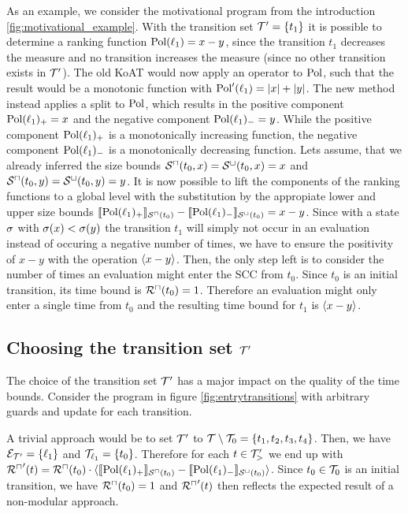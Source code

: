 



As an example, we consider the motivational program from the introduction \ref{fig:motivational_example}.
With the transition set $\mathcal{T}' = \lbrace t_1 \rbrace$ it is possible to determine a ranking function $\text{Pol}(\ell_1) = x - y$, since the transition $t_1$ decreases the measure and no transition increases the measure (since no other transition exists in $\mathcal{T}'$).
The old KoAT would now apply an operator to $\text{Pol}$, such that the result would be a monotonic function with $\text{Pol}'(\ell_1) = \left|x\right| + \left|y\right|$.
The new method instead applies a split to $\text{Pol}$, which results in the positive component $\text{Pol}(\ell_1)_+ = x$ and the negative component $\text{Pol}(\ell_1)_- = y$.
While the positive component $\text{Pol}(\ell_1)_+$ is a monotonically increasing function, the negative component $\text{Pol}(\ell_1)_-$ is a monotonically decreasing function.
Lets assume, that we already inferred the size bounds ${\mathcal{S}^\sqcap}(t_0,x) = {\mathcal{S}^\sqcup}(t_0,x) = x$ and ${\mathcal{S}^\sqcap}(t_0,y) = {\mathcal{S}^\sqcup}(t_0,y) = y$.
It is now possible to lift the components of the ranking functions to a global level with the substitution by the appropiate lower and upper size bounds $\llbracket \text{Pol}(\ell_1)_+ \rrbracket_{{\mathcal{S}^\sqcap}(t_0)} - \llbracket \text{Pol}(\ell_1)_- \rrbracket_{{\mathcal{S}^\sqcup}(t_0)} = x - y$.
Since with a state $\sigma$ with $\sigma(x) < \sigma(y)$ the transition $t_1$ will simply not occur in an evaluation instead of occuring a negative number of times, we have to ensure the positivity of $x - y$ with the operation $\langle x - y\rangle$.
Then, the only step left is to consider the number of times an evaluation might enter the SCC from $t_0$.
Since $t_0$ is an initial transition, its time bound is ${\mathcal{R}^\sqcap}(t_0) = 1$.
Therefore an evaluation might only enter a single time from $t_0$ and the resulting time bound for $t_1$ is $\langle x - y\rangle$.

\subsection{Choosing the transition set $\mathcal{T}'$}



The choice of the transition set $\mathcal{T}'$ has a major impact on the quality of the time bounds.
Consider the program in figure \ref{fig:entrytransitions} with arbitrary guards and update for each transition.

A trivial approach would be to set $\mathcal{T}'$ to $\mathcal{T} \setminus \mathcal{T}_0 = \lbrace t_1, t_2, t_3, t_4 \rbrace$.
Then, we have $\mathcal{E}_{\mathcal{T}'} = \lbrace \ell_1 \rbrace$ and $\mathcal{T}_{\ell_1} = \lbrace t_0 \rbrace$.
Therefore for each $t \in \mathcal{T}'_>$ we end up with ${\mathcal{R}^\sqcap}'(t) = {\mathcal{R}^\sqcap}(t_0) \cdot \langle\llbracket \text{Pol}(\ell_1)_+ \rrbracket_{{\mathcal{S}^\sqcap}(t_0)} - \llbracket \text{Pol}(\ell_1)_- \rrbracket_{{\mathcal{S}^\sqcup}(t_0)}\rangle$.
Since $t_0 \in \mathcal{T}_0$ is an initial transition, we have ${\mathcal{R}^\sqcap}(t_0) = 1$ and ${\mathcal{R}^\sqcap}'(t)$ then reflects the expected result of a non-modular approach.

